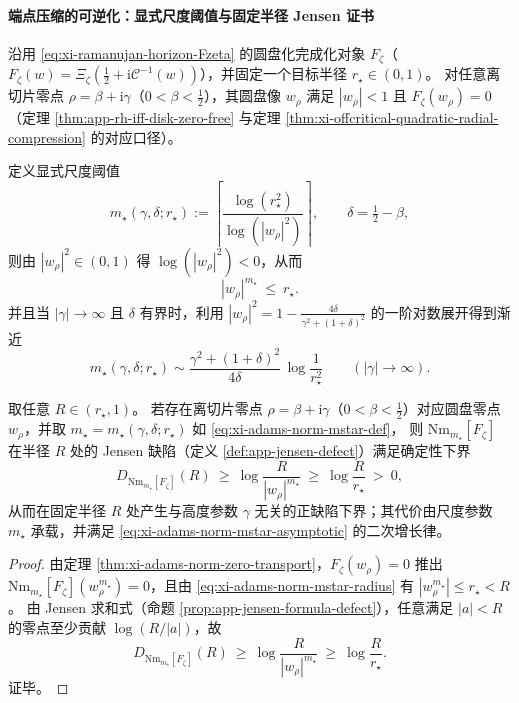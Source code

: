 \paragraph{端点压缩的可逆化：显式尺度阈值与固定半径 Jensen 证书}
沿用 \eqref{eq:xi-ramanujan-horizon-Fzeta} 的圆盘化完成化对象 \(F_\zeta\)（\(F_\zeta(w)=\Xi_\zeta(\frac12+\mathrm{i}\mathcal{C}^{-1}(w))\)），并固定一个目标半径 \(r_\star\in(0,1)\)。
对任意离切片零点 \(\rho=\beta+\mathrm{i}\gamma\)（\(0<\beta<\tfrac12\)），其圆盘像 \(w_\rho\) 满足 \(|w_\rho|<1\) 且 \(F_\zeta(w_\rho)=0\)（定理 \ref{thm:app-rh-iff-disk-zero-free} 与定理 \ref{thm:xi-offcritical-quadratic-radial-compression} 的对应口径）。
\par
定义显式尺度阈值
\begin{equation}\label{eq:xi-adams-norm-mstar-def}
m_\star(\gamma,\delta;r_\star)
:=\left\lceil \frac{\log(r_\star^{2})}{\log(|w_\rho|^{2})}\right\rceil,
\qquad
\delta=\tfrac12-\beta,
\end{equation}
则由 \(|w_\rho|^2\in(0,1)\) 得 \(\log(|w_\rho|^2)<0\)，从而
\begin{equation}\label{eq:xi-adams-norm-mstar-radius}
|w_\rho|^{m_\star}\ \le\ r_\star.
\end{equation}
并且当 \(|\gamma|\to\infty\) 且 \(\delta\) 有界时，利用
\(|w_\rho|^{2}=1-\frac{4\delta}{\gamma^{2}+(1+\delta)^{2}}\) 的一阶对数展开得到渐近
\begin{equation}\label{eq:xi-adams-norm-mstar-asymptotic}
\boxed{\;
m_\star(\gamma,\delta;r_\star)
\sim
\frac{\gamma^{2}+(1+\delta)^{2}}{4\delta}\,\log\!\frac{1}{r_\star^{2}}
\qquad(|\gamma|\to\infty).\;}
\end{equation}

\begin{corollary}\label{cor:xi-adams-norm-fixed-radius-jensen-certificate}
取任意 \(R\in(r_\star,1)\)。
若存在离切片零点 \(\rho=\beta+\mathrm{i}\gamma\)（\(0<\beta<\tfrac12\)）对应圆盘零点 \(w_\rho\)，并取 \(m_\star=m_\star(\gamma,\delta;r_\star)\) 如 \eqref{eq:xi-adams-norm-mstar-def}，
则 \(\mathrm{Nm}_{m_\star}[F_\zeta]\) 在半径 \(R\) 处的 Jensen 缺陷（定义 \ref{def:app-jensen-defect}）满足确定性下界
\[
D_{\mathrm{Nm}_{m_\star}[F_\zeta]}(R)\ \ge\ \log\!\frac{R}{|w_\rho|^{m_\star}}\ \ge\ \log\!\frac{R}{r_\star}\ >\ 0,
\]
从而在固定半径 \(R\) 处产生与高度参数 \(\gamma\) 无关的正缺陷下界；其代价由尺度参数 \(m_\star\) 承载，并满足 \eqref{eq:xi-adams-norm-mstar-asymptotic} 的二次增长律。
\end{corollary}

\begin{proof}
由定理 \ref{thm:xi-adams-norm-zero-transport}，\(F_\zeta(w_\rho)=0\) 推出 \(\mathrm{Nm}_{m_\star}[F_\zeta](w_\rho^{m_\star})=0\)，且由 \eqref{eq:xi-adams-norm-mstar-radius} 有 \(|w_\rho^{m_\star}|\le r_\star<R\)。
由 Jensen 求和式（命题 \ref{prop:app-jensen-formula-defect}），任意满足 \(|a|<R\) 的零点至少贡献 \(\log(R/|a|)\)，故
\[
D_{\mathrm{Nm}_{m_\star}[F_\zeta]}(R)\ \ge\ \log\!\frac{R}{|w_\rho|^{m_\star}}
\ \ge\ \log\!\frac{R}{r_\star}.
\]
证毕。
\end{proof}

